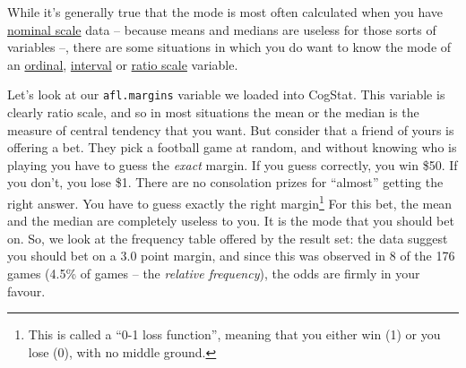\documentclass[
  11pt,
  a4paper,
  twoside,symmetric,openright]{book}
\theoremstyle{break}
\theoremstyle{break}
\begin{document}
While it's generally true that the mode is most often calculated when you have \hyperref[nominalscale]{nominal scale} data -- because means and medians are useless for those sorts of variables --, there are some situations in which you do want to know the mode of an \hyperref[ordinalscale]{ordinal}, \hyperref[intervalscale]{interval} or \hyperref[ratioscale]{ratio scale} variable.

\begin{example}
\protect\hypertarget{exm:exmode2}{}\label{exm:exmode2}Let's look at our \texttt{afl.margins} variable we loaded into CogStat. This variable is clearly ratio scale, and so in most situations the mean or the median is the measure of central tendency that you want. But consider that a friend of yours is offering a bet. They pick a football game at random, and without knowing who is playing you have to guess the \emph{exact} margin. If you guess correctly, you win \$50. If you don't, you lose \$1. There are no consolation prizes for ``almost'' getting the right answer. You have to guess exactly the right margin\footnote{This is called a ``0-1 loss function'', meaning that you either win (1) or you lose (0), with no middle ground.} For this bet, the mean and the median are completely useless to you. It is the mode that you should bet on. So, we look at the frequency table offered by the result set: the data suggest you should bet on a \(3.0\) point margin, and since this was observed in 8 of the 176 games (4.5\% of games -- the \emph{relative frequency}), the odds are firmly in your favour.
\end{example}
\end{document}
